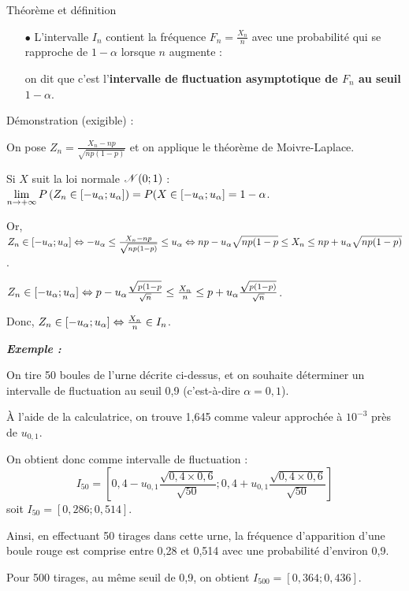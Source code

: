 \begin{spacing}{1.2}
\begin{bclogo}[couleur = gray!30 , arrondi = 0.1 ,logo = \bclampe , barre = snake , tailleOndu = 1.5]{Théorème et définition}
\begin{itemize}
\item[$\bullet$] L'intervalle $I_n$ contient la fréquence $F_n=\frac{X_n}{n}$ avec une probabilité qui se rapproche de $1-\alpha$ lorsque $n$ augmente : 

on dit que c'est l'\textbf{intervalle de fluctuation asymptotique de $F_n$ au seuil $1-\alpha$}.
\end{itemize}
\end{bclogo}

\bigskip

\begin{bclogo}[couleur = yellow!30 , arrondi = 0.1 ,logo = \bclampe , barre = snake , tailleOndu = 1.5]{Démonstration (exigible) :}

On pose $Z_n=\frac{X_n-np}{\sqrt{np(1-p)}}$ et on applique le théorème de Moivre-Laplace.

Si $X$ suit la loi normale $\mathscr{N}(0;1)$ : $\limn P\left(Z_n\in [-u_{\alpha};u_{\alpha}]\right)=P(X\in [-u_{\alpha};u_{\alpha}]=1-\alpha$.

Or, $Z_n\in [-u_{\alpha};u_{\alpha}] \Leftrightarrow -u_{\alpha}\leq \frac{X_n-np}{\sqrt{np(1-p)}}\leq u_{\alpha} \Leftrightarrow np-u_{\alpha}\sqrt{np(1-p}\leq X_n \leq np+u_{\alpha}\sqrt{np(1-p)}$.

$Z_n\in [-u_{\alpha};u_{\alpha}] \Leftrightarrow p-u_{\alpha}\frac{\sqrt{p(1-p}}{\sqrt{n}}\leq \frac{X_n}{n}\leq p+u_{\alpha}\frac{\sqrt{p(1-p)}}{\sqrt{n}}$.

Donc, $Z_n\in [-u_{\alpha};u_{\alpha}] \Leftrightarrow \frac{X_n}{n}\in I_n$.
\end{bclogo}

\bigskip

\textbf{\textit{Exemple :}}

On tire 50 boules de l'urne décrite ci-dessus, et on souhaite déterminer un intervalle de fluctuation au seuil 0,9 (c'est-à-dire $\alpha=0,1$).

À l'aide de la calculatrice, on trouve 1,645 comme valeur approchée à $10^{-3}$ près de $u_{0,1}$.

On obtient donc comme intervalle de fluctuation :
\[I_{50}=\left[0,4-u_{0,1}\frac{\sqrt{0,4\times 0,6}}{\sqrt{50}};0,4+u_{0,1}\frac{\sqrt{0,4\times 0,6}}{\sqrt{50}}\right]\]
soit $I_{50}=[0,286;0,514]$.

Ainsi, en effectuant 50 tirages dans cette urne, la fréquence d'apparition d'une boule rouge est comprise entre 0,28 et 0,514 avec une probabilité d'environ 0,9.

Pour 500 tirages, au même seuil de 0,9, on obtient $I_{500}=[0,364;0,436]$.


\end{spacing}
